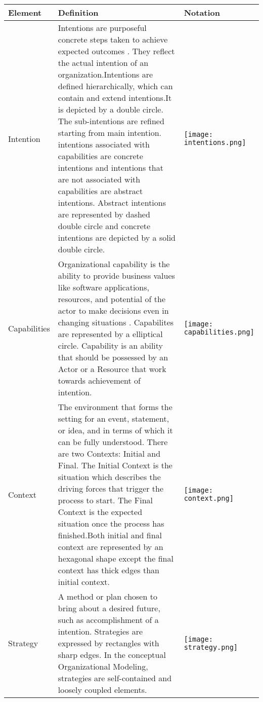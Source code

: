 \begin{center}
	\begin{longtable}{p{3cm}p{10cm}p{3cm}}
		\toprule 
		\textbf{Element} & \textbf{Definition} & \textbf{Notation} \\
		\midrule
		\endfirsthead
		Intention 			& Intentions are purposeful concrete steps taken to achieve expected outcomes . They reflect the actual intention of an organization.Intentions are defined hierarchically, which can contain and extend intentions.It is depicted by a double circle. The sub-intentions are refined starting from main intention. intentions associated with capabilities are concrete intentions and intentions that are not associated with capabilities are abstract intentions. Abstract intentions are represented by dashed double circle and concrete intentions are depicted by a solid double circle. & \begin{center} \texttt{[image: intentions.png]}  \end{center}  \\  
		
		Capabilities	& Organizational capability is the ability to provide business values like software applications, resources, and potential of the actor to make decisions even in changing situations \cite{Stirna2012}. Capabilites are represented by a elliptical circle. Capability is an ability that should be possessed by an Actor or a Resource that work towards achievement of intention.   & \begin{center} \texttt{[image: capabilities.png]} \end{center}   \\
		
		Context				& The environment that forms the setting for an event, statement, or idea, and in terms of which it can be fully understood. There are two Contexts: Initial and Final. The Initial Context is the situation which describes the driving forces that trigger the process to start. The Final Context is the expected situation once the process has finished.Both initial and final context are represented by an hexagonal shape except the final context has thick edges than initial context.  & \begin{center} \texttt{[image: context.png]} \end{center}  \\
		
		
		Strategy		&  A method or plan chosen to bring about a desired future, such as accomplishment of a intention. Strategies are expressed by rectangles with sharp edges. In the conceptual Organizational Modeling, strategies are self-contained and loosely coupled elements.   & \begin{center} \texttt{[image: strategy.png]} \end{center}   \\
		

\end{longtable}
\end{center}
